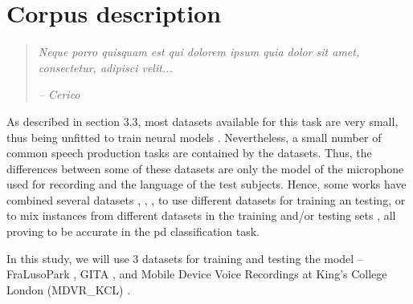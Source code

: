 
\chapter{Corpus description}
\label{ch:nihil}

\begin{quotation}
  {\small\it Neque porro quisquam est qui dolorem ipsum quia dolor sit amet, consectetur, adipisci velit...}

{\small\it -- Cerico}
\end{quotation}




As described in section 3.3, most datasets available for this task are very small, thus being unfitted to train neural models \cite{underfitting_small_datasets}. Nevertheless, a small number of common speech production tasks are contained by the datasets. Thus, the differences between some of these datasets are only the model of the microphone used for recording and the language of the test subjects. Hence, some works have combined several datasets \cite{parkinson_braga}, \cite{parkinson_acoustic_despotovic}, \cite{parkinson_phonemic_relevance}, \cite{x_vector_parkinson} to use different datasets for training an testing, or to mix instances from different datasets in the training and/or testing sets \cite{parkinson_three_languages}, all proving to be accurate in the \gls{pd} classification task.

In this study, we will use 3 datasets for training and testing the model -- FraLusoPark \cite{fralusopark}, GITA \cite{GITA}, and Mobile Device Voice Recordings at King's College London (MDVR\_KCL) \cite{MDVR}.

